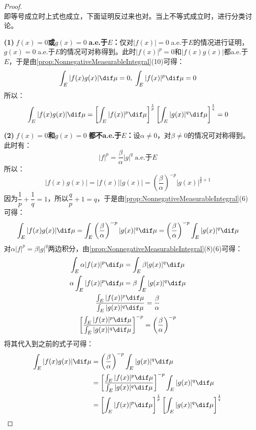 \begin{proof}
\begin{equation*}
	\end{equation*}
	即等号成立时上式也成立，下面证明反过来也对。当上不等式成立时，进行分类讨论。\par
	\textbf{(1)$\;f(x)=0$或$g(x)=0\;$a.e.于$E$：}仅对$|f(x)|=0\;$a.e.于$E$的情况进行证明，$g(x)=0\;$a.e.于$E$的情况可对称得到。此时$|f(x)|^p=0$和$|f(x)g(x)|$都a.e.于$E$，于是由\cref{prop:NonnegativeMeasurableIntegral}(10)可得：
	\begin{equation*}
		\int_{E}|f(x)g(x)|\dif\mu=0,\;\int_{E}|f(x)|^p\dif\mu=0
	\end{equation*}
	所以：
	\begin{equation*}
		\int_{E}^{}|f(x)g(x)|\dif \mu=\left[\int_{E}^{}|f(x)|^p\dif\mu\right]^{\frac{1}{p}}\left[\int_{E}^{}|g(x)|^q\dif\mu\right]^{\frac{1}{q}}=0
	\end{equation*}\par
	\textbf{(2)$\;f(x)=0$和$g(x)=0\;$都不a.e.于$E$：}设$\alpha\ne0$，对$\beta\ne0$的情况可对称得到。此时有：
	\begin{equation*}
		|f|^p=\frac{\beta}{\alpha}|g|^q\;\text{a.e.于$E$}
	\end{equation*}
	所以：
	\begin{equation*}
		|f(x)g(x)|=|f(x)||g(x)|=\left(\frac{\beta}{\alpha}\right)^{-p}|g(x)|^{\frac{q}{p}+1}
	\end{equation*}
	因为$\dfrac{1}{p}+\dfrac{1}{q}=1$，所以$\dfrac{q}{p}+1=q$，于是由\cref{prop:NonnegativeMeasurableIntegral}(6)可得：
	\begin{equation*}
		\int_{E}|f(x)g(x)|\dif\mu=\int_{E}\left(\frac{\beta}{\alpha}\right)^{-p}|g(x)|^{q}\dif\mu=\left(\frac{\beta}{\alpha}\right)^{-p}\int_{E}|g(x)|^q\dif\mu
	\end{equation*}
	对$\alpha|f|^p=\beta|g|^q$两边积分，由\cref{prop:NonnegativeMeasurableIntegral}(8)(6)可得：
	\begin{gather*}
		\int_{E}\alpha|f(x)|^p\dif\mu=\int_{E}\beta |g(x)|^q\dif\mu \\
		\alpha\int_{E}|f(x)|^p\dif\mu=\beta\int_{E}|g(x)|^q\dif\mu \\
		\frac{\int_{E}|f(x)|^p\dif\mu}{\int_{E}|g(x)|^q\dif\mu}=\frac{\beta}{\alpha} \\
		\left[\frac{\int_{E}|f(x)|^p\dif\mu}{\int_{E}|g(x)|^q\dif\mu}\right]^{-p}=\left(\frac{\beta}{\alpha}\right)^{-p}
	\end{gather*}
	将其代入到之前的式子可得：
	\begin{align*}
		\int_{E}|f(x)g(x)|\dif\mu&=\left(\frac{\beta}{\alpha}\right)^{-p}\int_{E}|g(x)|^q\dif\mu \\
		&=\left[\frac{\int_{E}|f(x)|^p\dif\mu}{\int_{E}|g(x)|^q\dif\mu}\right]^{-p}\int_{E}|g(x)|^q\dif\mu \\
		&=\left[\int_{E}|f(x)|^p\dif\mu\right]^{\frac{1}{p}}\left[\int_{E}|g(x)|^q\dif\mu\right]^{\frac{1}{q}}\qedhere
	\end{align*}
\end{proof}
